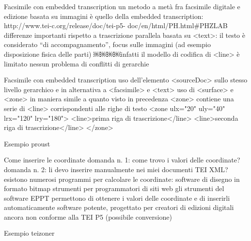 Facsimile con embedded transcription un metodo a metà fra facsimile digitale e edizione basata
su immagini è quello della embedded transcription: http://www.tei-c.org/release/doc/tei-p5-
doc/en/html/PH.html#PHZLAB
differenze importanti rispetto a trascrizione parallela basata su <text>:
il testo è considerato “di accompagnamento”, focus sulle immagini (ad esempio disposizione fisica delle parti)
￼￼￼￼infatti il modello di codifica di <line> è limitato nessun problema di conflitti di gerarchie

Facsimile con embedded transcription uso dell’elemento <sourceDoc> sullo stesso livello
gerarchico e in alternativa a <facsimile> e <text>
uso di <surface> e <zone> in maniera simile a quanto visto in precedenza
<zone> contiene una serie di <line> corrispondenti alle righe di testo
<zone ulx="20" uly="40" lrx="120" lry="180">
   <line>prima riga di trascrizione</line>
   <line>seconda riga di trascrizione</line>
</zone>

Esempio proust

Come inserire le coordinate
domanda n. 1: come trovo i valori delle coordinate?
domanda n. 2: li devo inserire manualmente nei miei documenti TEI XML?
esistono numerosi programmi per calcolare le coordinate:
software di disegno in formato bitmap strumenti per programmatori di siti web
gli strumenti del software EPPT permettono di ottenere i valori delle coordinate e di inserirli automaticamente
software potente, progettato per creatori di edizioni digitali ancora non conforme alla TEI P5 (possibile conversione)

Esempio teizoner




